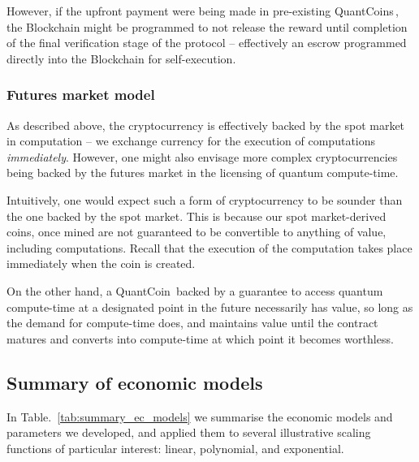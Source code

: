 However, if the upfront payment were being made in pre-existing QuantCoins\texttrademark\,, the Blockchain might be programmed to not release the reward until completion of the final verification stage of the protocol -- effectively an escrow programmed directly into the Blockchain for self-execution.

%
%

\subsubsection{Futures market model}

As described above, the cryptocurrency is effectively backed by the spot market in computation -- we exchange currency for the execution of computations \textit{immediately}. However, one might also envisage more complex cryptocurrencies being backed by the futures market in the licensing of quantum compute-time.

Intuitively, one would expect such a form of cryptocurrency to be sounder than the one backed by the spot market. This is because our spot market-derived coins, once mined are not guaranteed to be convertible to anything of value, including computations. Recall that the execution of the computation takes place immediately when the coin is created.

On the other hand, a QuantCoin\texttrademark\, backed by a guarantee to access quantum compute-time at a designated point in the future necessarily has value, so long as the demand for compute-time does, and maintains value until the contract matures and converts into compute-time at which point it becomes worthless.

%
%

\subsection{Summary of economic models}

In Table.~\ref{tab:summary_ec_models} we summarise the economic models and parameters we developed, and applied them to several illustrative scaling functions of particular interest: linear, polynomial, and exponential.

\renewcommand{\tablename}{TABLE}
\renewcommand{\arraystretch}{0.5}

